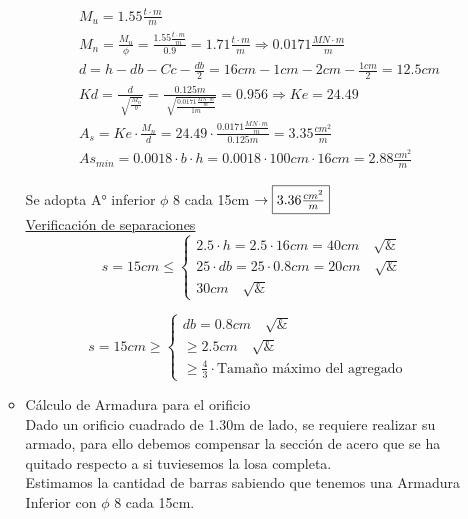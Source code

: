 \begin{enumerate}
\begin{itemize}
\begin{align*}
& M_u = 1.55 \frac{t \cdot m}{m} \\
& M_n = \frac{M_u}{\phi} = \frac{1.55 \frac{t \cdot m}{m}}{0.9} = 1.71 \frac{t \cdot m}{m} \Rightarrow 0.0171 \frac{MN \cdot m}{m} \\
& d = h -db - Cc - \frac{db}{2}= 16cm - 1cm - 2cm - \frac{1cm}{2}= 12.5cm \\
& Kd = \frac{d}{\sqrt[]{\frac{M_n}{b}}} = \frac{0.125m}{\sqrt[]{\frac{0.0171 \frac{MN \cdot m}{m}}{1m}}} = 0.956 \Rightarrow Ke = 24.49 \\
& A_s = Ke \cdot \frac{M_n}{d} = 24.49 \cdot \frac{0.0171 \frac{MN \cdot m}{m}}{0.125m} = 3.35 \frac{cm^2}{m}\\
& As_{min} = 0.0018 \cdot b \cdot h = 0.0018 \cdot 100cm \cdot 16cm = 2.88 \frac{cm^2}{m}
\end{align*}

Se adopta A° inferior $\phi$ 8 cada 15cm $\rightarrow \framebox{$3.36 \frac{cm^2}{m}$}$ \\

\newpage
\underline{Verificación de separaciones}\\

\[ s = 15cm \leq \left\{ \begin{array}{ll}
         2.5 \cdot h = 2.5 \cdot 16cm = 40cm \quad \surd & \\
         25 \cdot db = 25 \cdot 0.8cm = 20cm \quad \surd &\\
         30cm \quad \surd & \end{array} \right. \] 
         
\[ s =15cm \geq \left\{ \begin{array}{ll}
         db = 0.8cm \quad \surd & \\
         \geq 2.5cm \quad \surd &\\
         \geq \frac{4}{3} \cdot \text{Tamaño máximo del agregado} & \end{array} \right. \] 

\item Cálculo de Armadura para el orificio \\

Dado un orificio cuadrado de 1.30m de lado, se requiere realizar su armado, para ello debemos compensar la sección de acero que se ha quitado respecto a si tuviesemos la losa completa.\\
Estimamos la cantidad de barras sabiendo que tenemos una Armadura Inferior con $\phi$ 8 cada 15cm.\\


\end{itemize}
\end{enumerate}
